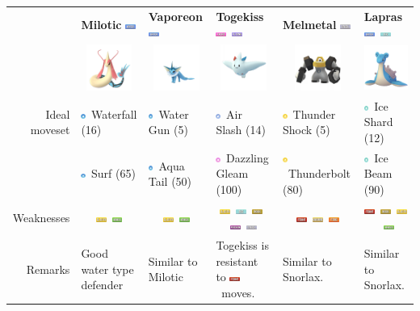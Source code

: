 \documentclass[8pt,aspectratio=169,compress]{beamer}
\newcommand{\fightingfull}{\includegraphics[height=0.15cm]{../../images/type/full/Fighting.png}}
\newcommand{\electricfull}{\includegraphics[height=0.15cm]{../../images/type/full/Electric.png}}
\newcommand{\fairyfull}{\includegraphics[height=0.15cm]{../../images/type/full/Fairy.png}}
\newcommand{\firefull}{\includegraphics[height=0.15cm]{../../images/type/full/Fire.png}}
\newcommand{\flyingfull}{\includegraphics[height=0.15cm]{../../images/type/full/Flying.png}}
\newcommand{\grassfull}{\includegraphics[height=0.15cm]{../../images/type/full/Grass.png}}
\newcommand{\groundfull}{\includegraphics[height=0.15cm]{../../images/type/full/Ground.png}}
\newcommand{\icefull}{\includegraphics[height=0.15cm]{../../images/type/full/Ice.png}}
\newcommand{\rockfull}{\includegraphics[height=0.15cm]{../../images/type/full/Rock.png}}
\newcommand{\waterfull}{\includegraphics[height=0.15cm]{../../images/type/full/Water.png}}
\newcommand{\poisonfull}{\includegraphics[height=0.15cm]{../../images/type/full/Poison.png}}
\newcommand{\steelfull}{\includegraphics[height=0.15cm]{../../images/type/full/Steel.png}}
\newcommand{\icesimp}{\includegraphics[height=0.15cm]{../../images/type/simplified/ice.png}}
\newcommand{\electricsimp}{\includegraphics[height=0.15cm]{../../images/type/simplified/electric.png}}
\newcommand{\watersimp}{\includegraphics[height=0.15cm]{../../images/type/simplified/water.png}}
\newcommand{\fairysimp}{\includegraphics[height=0.15cm]{../../images/type/simplified/fairy.png}}
\newcommand{\flyingsimp}{\includegraphics[height=0.15cm]{../../images/type/simplified/flying.png}}
\begin{document}
\begin{frame}
\begin{block}{}
\begin{tiny}
\begin{itemize}
\begin{center}
\begin{tabular}{rp{1.9cm}p{1.9cm}p{1.9cm}p{1.9cm}p{1.9cm}}
& \textbf{Milotic} \hfill \waterfull & \textbf{Vaporeon} \hfill \waterfull  & \textbf{Togekiss} \hfill \fairyfull~\flyingfull   & \textbf{Melmetal} \hfill \steelfull & \textbf{Lapras} \hfill \waterfull~\icefull \\
&\multicolumn{1}{c}{\includegraphics[width=1.5cm]{../../images/pokemon/Milotic}} &
\multicolumn{1}{c}{\includegraphics[width=1.5cm]{../../images/pokemon/Vaporeon}} &
\multicolumn{1}{c}{\includegraphics[width=1.5cm]{../../images/pokemon/Togekiss}} &
\multicolumn{1}{c}{\includegraphics[width=1.5cm]{../../images/pokemon/Melmetal}} &
\multicolumn{1}{c}{\includegraphics[width=1.5cm]{../../images/pokemon/Lapras}} \\ \hline
Ideal moveset & \watersimp~Waterfall (16) & \watersimp~Water Gun (5) & \flyingsimp~Air Slash (14) &  \electricsimp~Thunder Shock (5) & \icesimp~Ice Shard (12) \\
& \watersimp~Surf (65) & \watersimp~Aqua Tail (50) & \fairysimp~Dazzling Gleam (100) &  \electricsimp~Thunderbolt (80) & \icesimp~Ice Beam (90)  \\  \hline
Weaknesses & \multicolumn{1}{c}{\electricfull~\grassfull} & \multicolumn{1}{c}{\electricfull~\grassfull} & \multicolumn{1}{c}{\electricfull~\icefull~\rockfull~\poisonfull~\steelfull} & \multicolumn{1}{c}{\fightingfull~\groundfull~\firefull} & \multicolumn{1}{c}{\fightingfull~\rockfull~\electricfull~\grassfull} \\ \hline
Remarks & Good water type defender & Similar to Milotic & Togekiss is resistant to \fightingfull~moves. & Similar to Snorlax. & Similar to Snorlax.
\end{tabular}
\end{center}

\end{itemize}

\end{tiny}
\end{block}
\end{frame}
\end{document}
